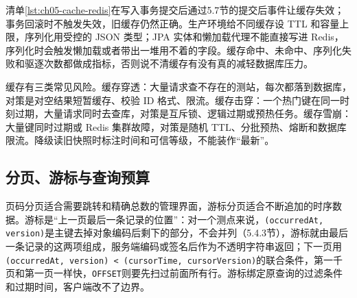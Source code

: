 清单\ref{lst:ch05-cache-redis}在写入事务提交后通过5.7节的提交后事件让缓存失效；事务回滚时不触发失效，旧缓存仍然正确。生产环境给不同缓存设 TTL 和容量上限，序列化用受控的 JSON 类型；JPA 实体和懒加载代理不能直接写进 Redis，序列化时会触发懒加载或者带出一堆用不着的字段。缓存命中、未命中、序列化失败和驱逐次数都做成指标，否则说不清缓存有没有真的减轻数据库压力。

缓存有三类常见风险。缓存穿透：大量请求查不存在的测站，每次都落到数据库，对策是对空结果短暂缓存、校验 ID 格式、限流。缓存击穿：一个热门键在同一时刻过期，大量请求同时去查库，对策是互斥锁、逻辑过期或预热任务。缓存雪崩：大量键同时过期或 Redis 集群故障，对策是随机 TTL、分批预热、熔断和数据库限流。降级读旧快照时标注时间和可信等级，不能装作“最新”。

\subsection{分页、游标与查询预算}

页码分页适合需要跳转和精确总数的管理界面，游标分页适合不断追加的时序数据。游标是“上一页最后一条记录的位置”：对一个测点来说，\texttt{(occurredAt, version)}是主键去掉对象编码后剩下的部分，不会并列（5.4.3节），游标就由最后一条记录的这两项组成，服务端编码或签名后作为不透明字符串返回；下一页用\texttt{(occurredAt, version) < (cursorTime, cursorVersion)}的联合条件，第一千页和第一页一样快，\texttt{OFFSET}则要先扫过前面所有行。游标绑定原查询的过滤条件和过期时间，客户端改不了边界。


